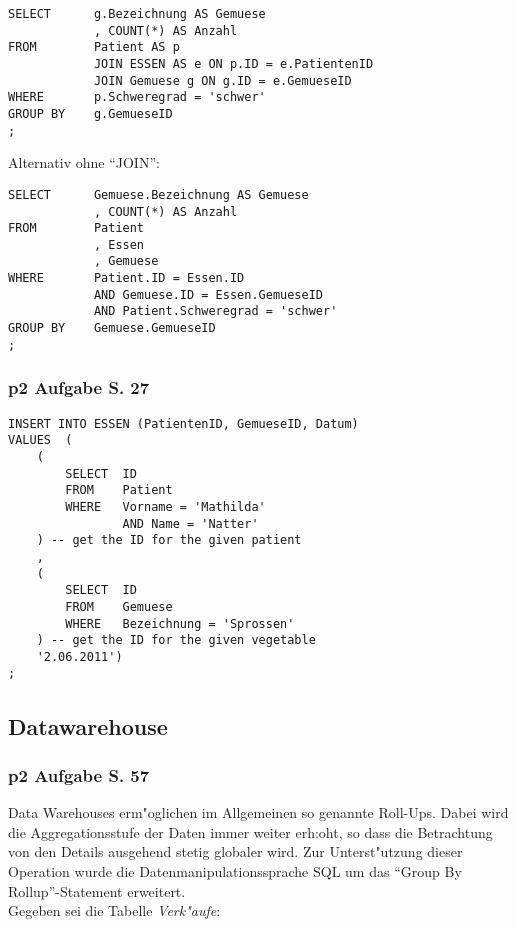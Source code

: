 \lstset{style=customSQL}
\begin{lstlisting}
SELECT      g.Bezeichnung AS Gemuese
            , COUNT(*) AS Anzahl
FROM        Patient AS p
            JOIN ESSEN AS e ON p.ID = e.PatientenID
            JOIN Gemuese g ON g.ID = e.GemueseID
WHERE       p.Schweregrad = 'schwer'
GROUP BY    g.GemueseID
;
\end{lstlisting}
Alternativ ohne "`JOIN"':
\lstset{style=customSQL}
\begin{lstlisting}
SELECT      Gemuese.Bezeichnung AS Gemuese
            , COUNT(*) AS Anzahl
FROM        Patient
            , Essen
            , Gemuese
WHERE       Patient.ID = Essen.ID
            AND Gemuese.ID = Essen.GemueseID
            AND Patient.Schweregrad = 'schwer'
GROUP BY    Gemuese.GemueseID
;
\end{lstlisting}

\subsubsection{p2 Aufgabe S. 27}

\lstset{style=customSQL}
\begin{lstlisting}
INSERT INTO ESSEN (PatientenID, GemueseID, Datum)
VALUES  (
    (
        SELECT  ID
        FROM    Patient
        WHERE   Vorname = 'Mathilda'
                AND Name = 'Natter'
    ) -- get the ID for the given patient
    ,
    (
        SELECT  ID
        FROM    Gemuese
        WHERE   Bezeichnung = 'Sprossen'
    ) -- get the ID for the given vegetable
    '2.06.2011')
;
\end{lstlisting}


\subsection{Datawarehouse}

\subsubsection{p2 Aufgabe S. 57}
Data Warehouses erm"oglichen im Allgemeinen so genannte Roll-Ups.
Dabei wird die Aggregationsstufe der Daten immer weiter erh:oht, so dass die Betrachtung von den Details ausgehend stetig globaler wird.
Zur Unterst"utzung dieser Operation wurde die Datenmanipulationssprache SQL um das "`Group By Rollup"'-Statement erweitert.\\\noindent
Gegeben sei die Tabelle \textit{Verk"aufe}:\\

